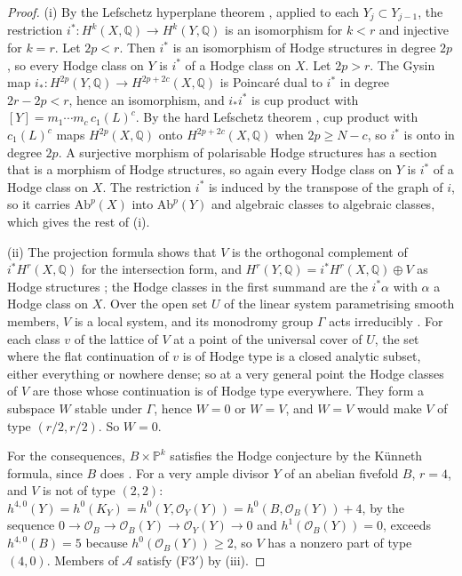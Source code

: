 \documentclass[11pt,reqno]{amsart}
\theoremstyle{plain}
\theoremstyle{definition}
\theoremstyle{remark}
\newcommand{\QQ}{\mathbb{Q}}
\newcommand{\PP}{\mathbb{P}}
\newcommand{\cO}{\mathcal{O}}
\begin{document}
\begin{proof}
(i) By the Lefschetz hyperplane theorem \cite[Chapter~1]{Voi03}, applied
to each $Y_{j}\subset Y_{j-1}$, the restriction $i^{*}\colon H^{k}(X,\QQ)\to
H^{k}(Y,\QQ)$ is an isomorphism for $k<r$ and injective for $k=r$. Let
$2p<r$. Then $i^{*}$ is an isomorphism of Hodge structures in degree $2p$,
so every Hodge class on $Y$ is $i^{*}$ of a Hodge class on $X$. Let $2p>r$.
The Gysin map $i_{*}\colon H^{2p}(Y,\QQ)\to H^{2p+2c}(X,\QQ)$ is Poincar\'e
dual to $i^{*}$ in degree $2r-2p<r$, hence an isomorphism, and
$i_{*}i^{*}$ is cup product with $[Y]=m_{1}\cdots m_{c}\,c_{1}(L)^{c}$. By the
hard Lefschetz theorem \cite[Chapter~6]{Voi02}, cup product with
$c_{1}(L)^{c}$ maps $H^{2p}(X,\QQ)$ onto $H^{2p+2c}(X,\QQ)$ when $2p\ge N-c$,
so $i^{*}$ is onto in degree $2p$. A surjective morphism of polarisable
Hodge structures has a section that is a morphism of Hodge structures, so
again every Hodge class on $Y$ is $i^{*}$ of a Hodge class on $X$. The
restriction $i^{*}$ is induced by the transpose of the graph of $i$, so it
carries $\mathrm{Ab}^{p}(X)$ into $\mathrm{Ab}^{p}(Y)$ and algebraic classes
to algebraic classes, which gives the rest of (i).

(ii) The projection formula shows that $V$ is the orthogonal complement of
$i^{*}H^{r}(X,\QQ)$ for the intersection form, and
$H^{r}(Y,\QQ)=i^{*}H^{r}(X,\QQ)\oplus V$ as Hodge structures
\cite[Chapter~2]{Voi03}; the Hodge classes in the first summand are the
$i^{*}\alpha$ with $\alpha$ a Hodge class on $X$. Over the open set $U$ of
the linear system parametrising smooth members, $V$ is a local system, and
its monodromy group $\Gamma$ acts irreducibly \cite[Chapter~3]{Voi03}. For
each class $v$ of the lattice of $V$ at a point of the universal cover of
$U$, the set where the flat continuation of $v$ is of Hodge type is a closed
analytic subset, either everything or nowhere dense; so at a very general
point the Hodge classes of $V$ are those whose continuation is of Hodge type
everywhere. They form a subspace $W$ stable under $\Gamma$, hence $W=0$ or
$W=V$, and $W=V$ would make $V$ of type $(r/2,r/2)$. So $W=0$.

For the consequences, $B\times\PP^{k}$ satisfies the Hodge conjecture by the
K\"unneth formula, since $B$ does \cite{Mar25a,Mar25b,MZ99}. For a very ample
divisor $Y$ of an abelian fivefold $B$, $r=4$, and $V$ is not of type $(2,2)$:
$h^{4,0}(Y)=h^{0}(K_{Y})=h^{0}(Y,\cO_{Y}(Y))=h^{0}(B,\cO_{B}(Y))+4$, by the
sequence $0\to\cO_{B}\to\cO_{B}(Y)\to\cO_{Y}(Y)\to0$ and $h^{1}(\cO_{B}(Y))=0$,
exceeds $h^{4,0}(B)=5$ because $h^{0}(\cO_{B}(Y))\ge2$, so $V$ has a nonzero
part of type $(4,0)$. Members of $\mathcal{A}$ satisfy \textup{(F3$'$)} by
(iii).
\end{proof}
\end{document}
